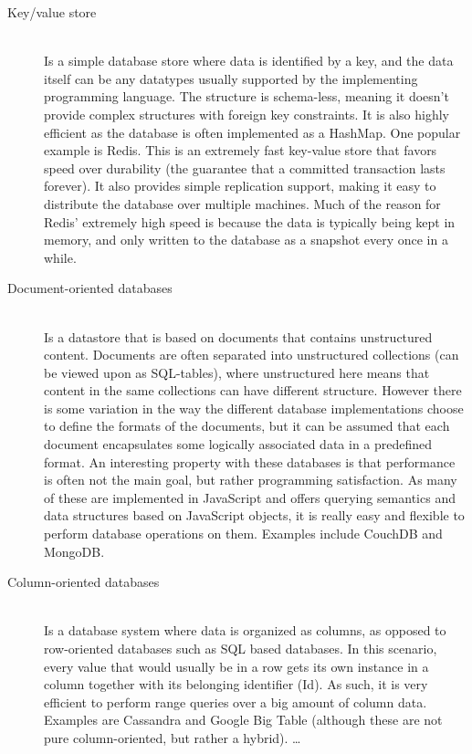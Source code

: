 \begin{description}
  \item[Key/value store] \hfill \\
	Is a simple database store where data is identified by a key, and the data itself can be any datatypes usually supported by the implementing programming language. The structure is schema-less, meaning it doesn't provide complex structures with foreign key constraints. It is also highly efficient as the database is often implemented as a HashMap. One popular example is Redis. \cite{redis} This is an extremely fast key-value store that favors speed over durability (the guarantee that a committed transaction lasts forever). It also provides simple replication support, making it easy to distribute the database over multiple machines. Much of the reason for Redis' extremely high speed is because the data is typically being kept in memory, and only written to the database as a snapshot every once in a while. 
	
  \item[Document-oriented databases] \hfill \\
  Is a datastore that is based on documents that contains unstructured content. Documents are often separated into unstructured collections (can be viewed upon as SQL-tables), where unstructured here means that content in the same collections can have different structure. However there is some variation in the way the different database implementations choose to define the formats of the documents, but it can be assumed that each document encapsulates some logically associated data in a predefined format. An interesting property with these databases is that performance is often not the main goal, but rather programming satisfaction. As many of these are implemented in JavaScript and offers querying semantics and data structures based on JavaScript objects, it is really easy and flexible to perform database operations on them. Examples include CouchDB\cite{couch} and MongoDB. \cite{mongo}
  \item[Column-oriented databases] \hfill \\
  Is a database system where data is organized as columns, as opposed to row-oriented databases such as SQL based databases. In this scenario, every value that would usually be in a row gets its own instance in a column together with its belonging identifier (Id). As such, it is very efficient to perform range queries over a big amount of column data. Examples are Cassandra\cite{cassandra} and Google Big Table \cite{bigtable} (although these are not pure column-oriented, but rather a hybrid). 
	 \ldots
\end{description}

